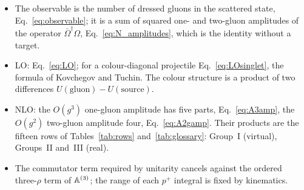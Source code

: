 \begin{summarybox}
\begin{itemize}
\item The observable is the number of dressed gluons in the scattered state, Eq.~\eqref{eq:observable}; it is a sum of squared one- and two-gluon amplitudes of the operator $\bar\Omega^\dagger\Omega$, Eq.~\eqref{eq:N_amplitudes}, which is the identity without a target.
\item LO: Eq.~\eqref{eq:LO}; for a colour-diagonal projectile Eq.~\eqref{eq:LOsinglet}, the formula of Kovchegov and Tuchin. The colour structure is a product of two differences $U(\text{gluon})-U(\text{source})$.
\item NLO: the $O(g^3)$ one-gluon amplitude has five parts, Eq.~\eqref{eq:A3amp}, the $O(g^2)$ two-gluon amplitude four, Eq.~\eqref{eq:A2gamp}. Their products are the fifteen rows of Tables~\ref{tab:rows} and~\ref{tab:glossary}: Group~I (virtual), Groups~II and~III (real).
\item The commutator term required by unitarity cancels against the ordered three-$\rho$ term of $\mathbb{A}^{(3)}$; the range of each $p^+$ integral is fixed by kinematics.
\end{itemize}
\end{summarybox}

